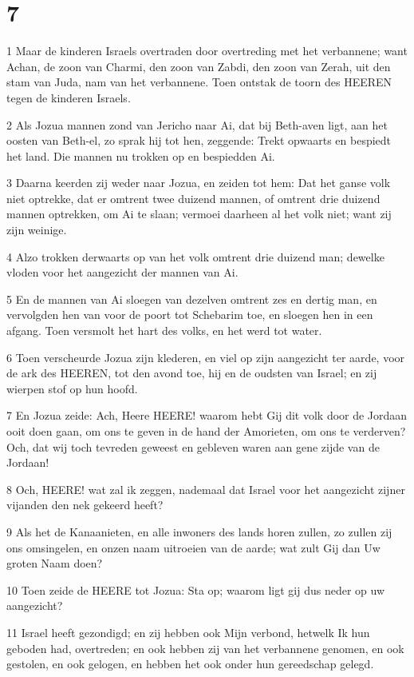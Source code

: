 \chapter{7}

\par 1 Maar de kinderen Israels overtraden door overtreding met het verbannene; want Achan, de zoon van Charmi, den zoon van Zabdi, den zoon van Zerah, uit den stam van Juda, nam van het verbannene. Toen ontstak de toorn des HEEREN tegen de kinderen Israels.
\par 2 Als Jozua mannen zond van Jericho naar Ai, dat bij Beth-aven ligt, aan het oosten van Beth-el, zo sprak hij tot hen, zeggende: Trekt opwaarts en bespiedt het land. Die mannen nu trokken op en bespiedden Ai.
\par 3 Daarna keerden zij weder naar Jozua, en zeiden tot hem: Dat het ganse volk niet optrekke, dat er omtrent twee duizend mannen, of omtrent drie duizend mannen optrekken, om Ai te slaan; vermoei daarheen al het volk niet; want zij zijn weinige.
\par 4 Alzo trokken derwaarts op van het volk omtrent drie duizend man; dewelke vloden voor het aangezicht der mannen van Ai.
\par 5 En de mannen van Ai sloegen van dezelven omtrent zes en dertig man, en vervolgden hen van voor de poort tot Schebarim toe, en sloegen hen in een afgang. Toen versmolt het hart des volks, en het werd tot water.
\par 6 Toen verscheurde Jozua zijn klederen, en viel op zijn aangezicht ter aarde, voor de ark des HEEREN, tot den avond toe, hij en de oudsten van Israel; en zij wierpen stof op hun hoofd.
\par 7 En Jozua zeide: Ach, Heere HEERE! waarom hebt Gij dit volk door de Jordaan ooit doen gaan, om ons te geven in de hand der Amorieten, om ons te verderven? Och, dat wij toch tevreden geweest en gebleven waren aan gene zijde van de Jordaan!
\par 8 Och, HEERE! wat zal ik zeggen, nademaal dat Israel voor het aangezicht zijner vijanden den nek gekeerd heeft?
\par 9 Als het de Kanaanieten, en alle inwoners des lands horen zullen, zo zullen zij ons omsingelen, en onzen naam uitroeien van de aarde; wat zult Gij dan Uw groten Naam doen?
\par 10 Toen zeide de HEERE tot Jozua: Sta op; waarom ligt gij dus neder op uw aangezicht?
\par 11 Israel heeft gezondigd; en zij hebben ook Mijn verbond, hetwelk Ik hun geboden had, overtreden; en ook hebben zij van het verbannene genomen, en ook gestolen, en ook gelogen, en hebben het ook onder hun gereedschap gelegd.
